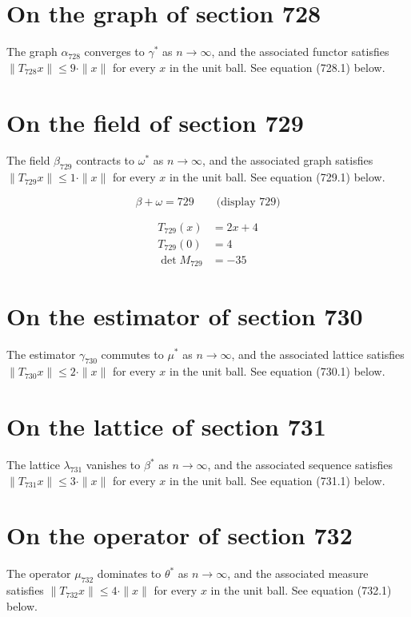 \documentclass{article}
\begin{document}
\section{On the graph of section 728}
The graph $\alpha_{728}$ converges to $\gamma^{*}$ as $n \to \infty$,
and the associated functor satisfies $\|T_{728} x\| \leq 9 \cdot \|x\|$
for every $x$ in the unit ball. See equation (728.1) below.

\section{On the field of section 729}
The field $\beta_{729}$ contracts to $\omega^{*}$ as $n \to \infty$,
and the associated graph satisfies $\|T_{729} x\| \leq 1 \cdot \|x\|$
for every $x$ in the unit ball. See equation (729.1) below.

$$
\beta + \omega = 729 \qquad \text{(display 729)}
$$

\begin{align}
T_{729}(x) &= 2 x + 4 \\
T_{729}(0) &= 4 \\
\det M_{729} &= -35
\end{align}

\section{On the estimator of section 730}
The estimator $\gamma_{730}$ commutes to $\mu^{*}$ as $n \to \infty$,
and the associated lattice satisfies $\|T_{730} x\| \leq 2 \cdot \|x\|$
for every $x$ in the unit ball. See equation (730.1) below.

\section{On the lattice of section 731}
The lattice $\lambda_{731}$ vanishes to $\beta^{*}$ as $n \to \infty$,
and the associated sequence satisfies $\|T_{731} x\| \leq 3 \cdot \|x\|$
for every $x$ in the unit ball. See equation (731.1) below.

\section{On the operator of section 732}
The operator $\mu_{732}$ dominates to $\theta^{*}$ as $n \to \infty$,
and the associated measure satisfies $\|T_{732} x\| \leq 4 \cdot \|x\|$
for every $x$ in the unit ball. See equation (732.1) below.
\end{document}
